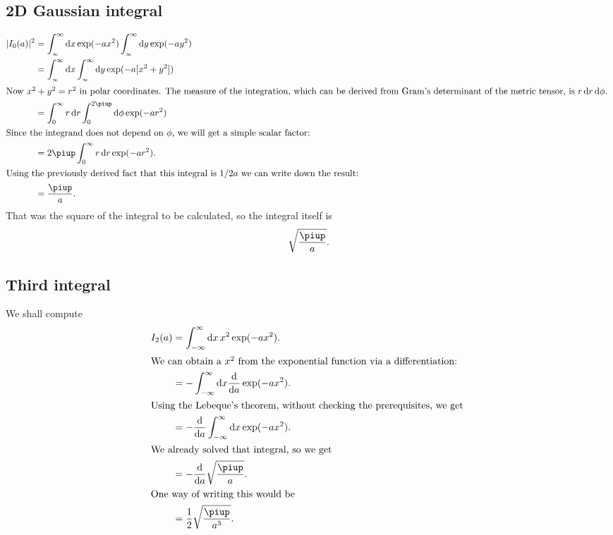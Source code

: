 \documentclass[11pt, english, fleqn, DIV=15, headinclude, BCOR=1cm]{scrartcl}
\begin{document}
\subsection{2D Gaussian integral}

\begin{align*}
    |I_0(a)|^2
    &=
    \int_{_\infty}^\infty \dif x \exp(-ax^2)
    \int_{_\infty}^\infty \dif y \exp(-ay^2) \\
    &=
    \int_{_\infty}^\infty \dif x \int_{_\infty}^\infty \dif y \exp(-a[x^2+y^2]) \\
    \intertext{%
        Now $x^2 + y^2 = r^2$ in polar coordinates. The measure of the
        integration, which can be derived from Gram's determinant of the
        metric tensor, is $r \dif r \dif \phi$.
    }
    &= \int_0^\infty r \dif r \int_0^{2\piup} \dif \phi \exp(-ar^2) \\
    \intertext{%
        Since the integrand does not depend on $\phi$, we will get a simple
        scalar factor:
    }
    &= 2 \piup \int_0^\infty r \dif r \exp(-ar^2). \\
    \intertext{%
        Using the previously derived fact that this integral is $1/2a$ we can
        write down the result:
    }
    &= \frac{\piup}a.
\end{align*}
That was the square of the integral to be calculated, so the integral itself is
\[
    \sqrt{\frac\piup a}.
\]

\subsection{Third integral}

We shall compute
\begin{align*}
    I_2(a)
    &= \int_{-\infty}^\infty \dif x \, x^2 \exp(-ax^2). \\
    \intertext{%
        We can obtain a $x^2$ from the exponential function via a
        differentiation:
    }
    &= - \int_{-\infty}^\infty \dif x \od{}a \exp(-ax^2). \\
    \intertext{%
        Using the Lebeque's theorem, without checking the prerequisites, we get
    }
    &= - \od{}a \int_{-\infty}^\infty \dif x \exp(-ax^2). \\
    \intertext{%
        We already solved that integral, so we get
    }
    &= - \od{}a \sqrt{\frac{\piup}{a}}. \\
    \intertext{%
        One way of writing this would be
    }
    &= \frac 12 \sqrt{\frac{\piup}{a^3}}.
\end{align*}
\end{document}
